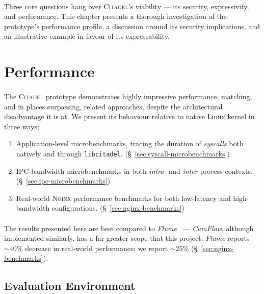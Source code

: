 \paragraph{} Three core questions hang over \textsc{Citadel}'s viability --- its security, expressivity, and performance. This chapter presents a thorough investigation of the prototype's performance profile, a discussion around its security implications, and an illustrative example in favour of its expressability.

\section{Performance}
\label{sec:performance}

\paragraph{} The \textsc{Citadel} prototype demonstrates highly impressive performance, matching, and in places surpassing, related approaches, despite the architectural disadvantage it is at. We present its behaviour relative to native Linux kernel in three ways;

\begin{enumerate}
    \item Application-level microbenchmarks, tracing the duration of \textit{syscalls} both natively and through \texttt{libcitadel}. (§~\ref{sec:syscall-microbenchmarks})
    \item IPC bandwidth microbenchmarks in both \textit{intra-} and \textit{inter-}process contexts. (§~\ref{sec:ipc-microbenchmarks})
    \item Real-world \textsc{Nginx} performance benchmarks for both low-latency and high-bandwidth configurations. (§~\ref{sec:nginx-benchmarks})
\end{enumerate}

\paragraph{}The results presented here are best compared to \textit{Flume}~\cite{flume} --- \textit{CamFlow}, although implemented similarly, has a far greater scope that this project. \textit{Flume} reports $\sim 40\%$ decrease in real-world performance; we report $\sim 25\%$ (§~\ref{sec:nginx-benchmarks}).

\subsection{Evaluation Environment}
